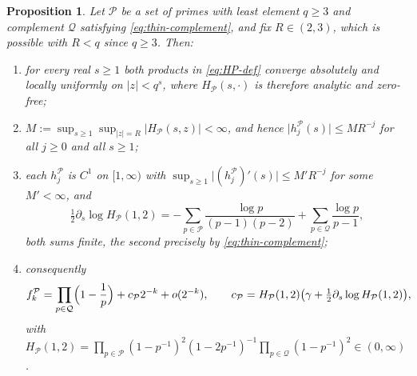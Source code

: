 \documentclass[11pt]{amsart}
\theoremstyle{plain}
\newtheorem{proposition}[theorem]{Proposition}
\theoremstyle{definition}
\newcommand{\abs}[1]{\lvert #1\rvert}
\begin{document}
\begin{proposition}\label{prop:general-interior}
Let $\mathcal P$ be a set of primes with least element $q\geq3$ and complement
$\mathcal Q$ satisfying \eqref{eq:thin-complement}, and fix
$R\in(2,3)$, which is possible with $R<q$ since $q\geq3$. Then:
\begin{enumerate}
\item[(i)] for every real $s\geq1$ both products in \eqref{eq:HP-def} converge
absolutely and locally uniformly on $\abs z<q^{s}$, where
$H_{\mathcal P}(s,\cdot)$ is therefore analytic and zero-free;
\item[(ii)] $M:=\sup_{s\geq1}\sup_{\abs z=R}\abs{H_{\mathcal P}(s,z)}<\infty$,
and hence $\abs{h_j^{\mathcal P}(s)}\leq MR^{-j}$ for all $j\geq0$ and all
$s\geq1$;
\item[(iii)] each $h_j^{\mathcal P}$ is $C^1$ on $[1,\infty)$ with
$\sup_{s\geq1}\abs{(h_j^{\mathcal P})'(s)}\leq M'R^{-j}$ for some
$M'<\infty$, and
\begin{equation}\label{eq:HP-logderiv}
  \tfrac12\partial_s\log H_{\mathcal P}(1,2)
   =-\sum_{p\in\mathcal P}\frac{\log p}{(p-1)(p-2)}
    +\sum_{p\in\mathcal Q}\frac{\log p}{p-1},
\end{equation}
both sums finite, the second precisely by \eqref{eq:thin-complement};
\item[(iv)] consequently
\begin{equation}\label{eq:general-interior}
  f_k^{\mathcal P}
   =\prod_{p\in\mathcal Q}\Bigl(1-\frac1p\Bigr)
    +c_{\mathcal P}2^{-k}+o(2^{-k}),
  \qquad
  c_{\mathcal P}=H_{\mathcal P}(1,2)
   \bigl(\gamma+\tfrac12\partial_s\log H_{\mathcal P}(1,2)\bigr),
\end{equation}
with
$H_{\mathcal P}(1,2)=\prod_{p\in\mathcal P}(1-p^{-1})^2(1-2p^{-1})^{-1}
 \prod_{p\in\mathcal Q}(1-p^{-1})^2\in(0,\infty)$.
\end{enumerate}
\end{proposition}
\end{document}
